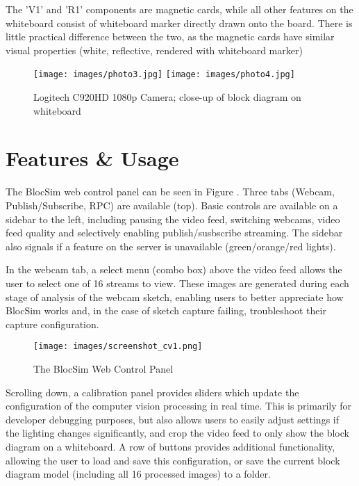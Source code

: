 The 'V1' and 'R1' components are magnetic cards, while all other features on the whiteboard consist of whiteboard marker directly drawn onto the board. There is little practical difference between the two, as the magnetic cards have similar visual properties (white, reflective, rendered with whiteboard marker)

\begin{figure}[ht!]
\centering
\texttt{[image: images/photo3.jpg]}
\texttt{[image: images/photo4.jpg]}
\caption{Logitech C920HD 1080p Camera; close-up of block diagram on whiteboard}
\label{im:hardware2}
\end{figure}

\clearpage

\section{Features \& Usage}

The BlocSim web control panel can be seen in Figure \label{im:screenshot_cv1}. Three tabs (Webcam, Publish/Subscribe, RPC) are available (top). Basic controls are available on a sidebar to the left, including pausing the video feed, switching webcams, video feed quality and selectively enabling publish/susbscribe streaming. The sidebar also signals if a feature on the server is unavailable (green/orange/red lights).

In the webcam tab, a select menu (combo box) above the video feed allows the user to select one of 16 streams to view. These images are generated during each stage of analysis of the webcam sketch, enabling users to better appreciate how BlocSim works and, in the case of sketch capture failing, troubleshoot their capture configuration.
\\

\begin{figure}[ht!]
\centering
\texttt{[image: images/screenshot\_cv1.png]}
\caption{The BlocSim Web Control Panel \cite{blocsim}}
\label{im:screenshot_cv1}
\end{figure}

\newpage

Scrolling down, a calibration panel provides sliders which update the configuration of the computer vision processing in real time. This is primarily for developer debugging purposes, but also allows users to easily adjust settings if the lighting changes significantly, and crop the video feed to only show the block diagram on a whiteboard. A row of buttons provides additional functionality, allowing the user to load and save this configuration, or save the current block diagram model (including all 16 processed images) to a folder.
\\

